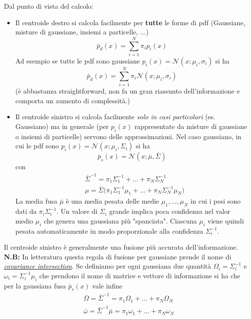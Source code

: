 Dal punto di vista del calcolo:
\begin{itemize}
\item Il centroide destro si calcola facilmente per \textbf{tutte} le forme di pdf (Gaussiane, misture di gaussiane, insiemi a particelle, ...)
 \begin{equation}
 \bar{p}_d(x) = \sum_{i=1}^N \pi_i p_i(x)
 \end{equation} Ad esempio se tutte le pdf sono gaussiane $p_i(x) = \mathcal{N}(x; \mu_i, \sigma_i)$ si ha
  \begin{equation}
    \bar{p}_d(x) = \sum_{i=1}^N \pi_i \mathcal{N}(x; \mu_i, \sigma_i)
  \end{equation} (\`e abbastanza straightforward, non fa un gran riassunto dell'informazione e comporta un aumento di complessit\`a.)
\item Il centroide sinistro si calcola facilmente \textit{solo in casi particolari} (es. Gaussiano) ma in generale (per $p_i(x)$ rappresentate da misture di gaussiane o insiemi di particelle) servono delle approssimazioni. Nel caso gaussiano, in cui le pdf sono $p_i(x) = \mathcal{N}(x; \mu_i, \Sigma_i)$ si ha
  \begin{equation}
  \bar{p}_s(x) = \mathcal{N}(x; \bar{\mu}, \bar{\Sigma})
  \end{equation} con
  \begin{align}
  &\bar{\Sigma}^{-1} = \pi_1 \Sigma_1^{-1} + \dots + \pi_N \Sigma_N^{-1} \\
  &\mu = \bar{\Sigma} \big ( \pi_1 \Sigma_1^{-1} \mu_1 + \dots + \pi_N \Sigma_N^{-1} \mu_N \big )
  \end{align} La media fusa $\bar{\mu}$ \`e una media pesata delle medie $\mu_1, \dots, \mu_N$ in cui i pesi sono dati da $\pi_i \Sigma_i^{-1}$. Un valore di $\Sigma_i$ grande implica poca confidenza nel valor medio $\mu_i$ che genera una gaussiana pi\`u "spanciata". Ciascuna $\mu_i$ viene quindi pesata automaticamente in modo proporzionale alla confidenza $\Sigma_i^{-1}$.
\end{itemize}
  Il centroide sinistro \`e generalmente una fusione pi\`u accurata dell'informazione.
  \textbf{N.B:} In letteratura questa regola di fusione per gaussiane prende il nome di \href{https://en.wikipedia.org/wiki/Covariance_intersection}{\textit{covariance intersection}}.
  Se definiamo per ogni gaussiana due quantit\`a $\Omega_i = \Sigma_i^{-1}$ e $\omega_i = \Sigma_i^{-1} \mu_i$ che prendono il nome di matrice e vettore di informazione si ha che per la gaussiana fusa $\bar{p}_s(x)$ vale infine
  \begin{align}
  &\bar{\Omega} = \bar{\Sigma}^{-1} = \pi_1 \Omega_1 + \dots + \pi_N \Omega_N \\
  &\bar{\omega} = \bar{\Sigma}^{-1} \bar{\mu} = \pi_1 \omega_1 + \dots + \pi_N \omega_N
  \end{align}
  
